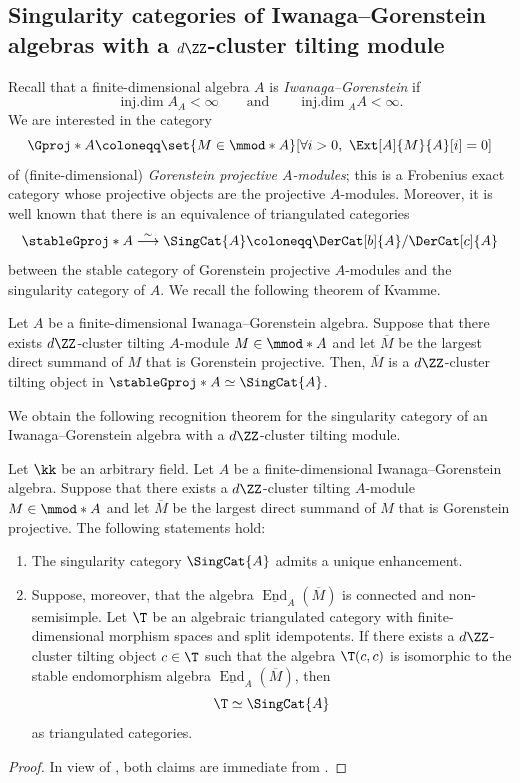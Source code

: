\documentclass[a4paper]{amsart}
\begin{document}
\subsection{Singularity categories of Iwanaga--Gorenstein algebras with
  a $d\ZZ$-cluster tilting module}

Recall that a finite-dimensional algebra $A$ is \emph{Iwanaga--Gorenstein} if
\[
  \operatorname{inj.dim} A_A<\infty\qquad\text{and}\qquad\operatorname{inj.dim} {}_AA<\infty.
\]
We are interested in the category
\[
  \Gproj*{A}\coloneqq\set{M\in\mmod*{A}}[\forall i>0,\ \Ext[A]{M}{A}[i]=0]
\]
of (finite-dimensional) \emph{Gorenstein projective $A$-modules}; this is a
Frobenius exact category whose projective objects are the projective
$A$-modules. Moreover, it is well known that there is an equivalence of
triangulated categories~\cite{Buc21}
\[
  \stableGproj*{A}\stackrel{\sim}{\longrightarrow}\SingCat{A}\coloneqq\DerCat[b]{A}/\DerCat[c]{A}
\]
between the stable category of Gorenstein projective
$A$-modules and the singularity category of $A$. We recall the following theorem
of Kvamme.

\begin{theorem}
  \label{thm:Kvamme}
  Let $A$ be a finite-dimensional Iwanaga--Gorenstein algebra. Suppose that
  there exists $d\ZZ$-cluster tilting $A$-module $M\in\mmod*{A}$ and let
  $\overline{M}$ be the largest direct summand of $M$ that is Gorenstein
  projective. Then, $\overline{M}$ is a $d\ZZ$-cluster tilting object in
  $\stableGproj*{A}\simeq\SingCat{A}$.
\end{theorem}

We obtain the following recognition theorem for the singularity category of an
Iwanaga--Gorenstein algebra with a $d\ZZ$-cluster tilting module.

\begin{theorem}
  \label{thm:Kvamme-recognition}
  Let $\kk$ be an arbitrary field. Let $A$ be a finite-dimensional
  Iwanaga--Gorenstein algebra. Suppose that there exists a $d\ZZ$-cluster
  tilting $A$-module $M\in\mmod*{A}$ and let $\overline{M}$ be the largest
  direct summand of $M$ that is Gorenstein projective. The following
  statements hold:
  \begin{enumerate}
  \item The singularity category $\SingCat{A}$ admits a unique enhancement.
  \item Suppose, moreover, that the
    algebra $\underline{\operatorname{End}}_{A}(\overline{M})$ is
    connected and non-semisimple. Let $\T$ be an algebraic triangulated category with finite-dimensional
    morphism spaces and split idempotents. If there exists a $d\ZZ$-cluster
    tilting object $c\in\T$ such that the algebra $\T(c,c)$ is isomorphic to the
    stable endomorphism algebra $\underline{\operatorname{End}}_{A}(\overline{M})$, then
    \[
      \T\simeq\SingCat{A}
    \]
    as triangulated categories.
  \end{enumerate}
\end{theorem}
\begin{proof}
  In view of , both claims are immediate from
  .
\end{proof}
\end{document}
